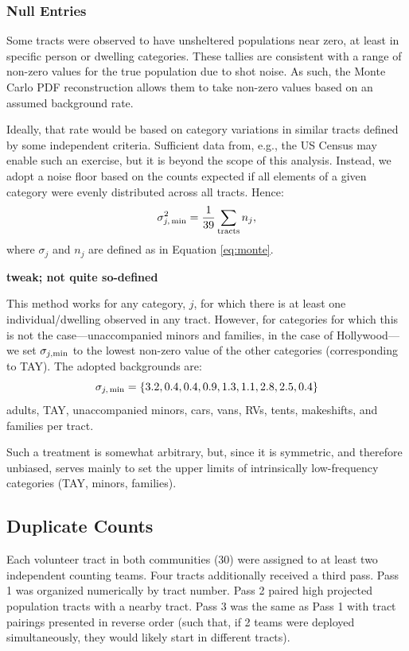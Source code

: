 \documentclass[11pt,twocolumn]{article}
\def\bfr{\bf\color{red}}
\begin{document}
\subsubsection{Null Entries}
\label{sec:nulls}

Some tracts were observed to have unsheltered populations near zero, at least in specific person or 
dwelling categories. These tallies are consistent with a range of non-zero values for the true population 
due to shot noise. As such, the Monte Carlo PDF reconstruction allows them to take non-zero values 
based on an assumed background rate. 

Ideally, that rate would be based on category variations in similar tracts defined by some independent 
criteria. Sufficient data from, e.g., the US Census may enable such an exercise, but it is beyond the scope of 
this analysis. Instead, we adopt a noise floor based on the counts expected if all elements of a given category
were evenly distributed across all tracts. Hence:
\begin{equation}
	\sigma_{j,\,\rm min}^{2} = \frac{1}{39}\sum_{\rm tracts}n_{j},
\end{equation}
where $\sigma_{j}$ and $n_{j}$ are defined as in Equation \ref{eq:monte}.

{\bfr tweak; not quite so-defined}

This method works for any category, $j$, for which there is at least one individual/dwelling observed in any 
tract. However, for categories for which this is not the case---unaccompanied minors and families, in the
case of Hollywood---we set $\sigma_{j, \rm min}$ to the lowest non-zero value of the other categories
(corresponding to TAY). The adopted backgrounds are: 
\begin{equation}
	\sigma_{j,\, \rm min}=\{3.2, 0.4, 0.4, 0.9, 1.3, 1.1, 2.8, 2.5, 0.4\}
\end{equation}
adults, TAY, unaccompanied minors, cars, vans, RVs, tents, makeshifts, and families per tract.

Such a treatment is somewhat arbitrary, but, since it is symmetric, and therefore unbiased, 
serves mainly to set the upper limits of intrinsically low-frequency categories (TAY, minors, families).

\subsection{Duplicate Counts}
\label{sec:dupes}

Each volunteer tract in both communities (30) were assigned to at least two independent counting teams.
Four tracts additionally received a third pass. Pass 1 was organized numerically by tract number.
Pass 2 paired high projected population tracts with a nearby tract. Pass 3 was the same as Pass 1 with 
tract pairings presented in reverse order (such that, if 2 teams were deployed simultaneously, they would
likely start in different tracts). 
\end{document}
